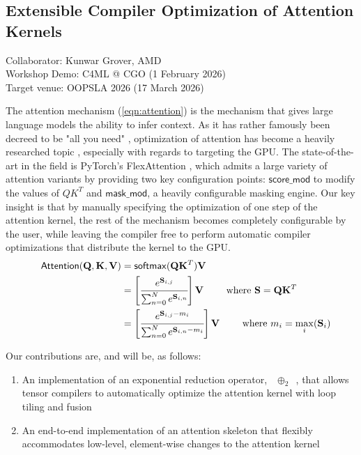 \documentclass[review, acmsmall, nonacm]{acmart}
\newcommand{\Attention}{\mathsf{Attention}}
\newcommand{\softmax}{\mathsf{softmax}}
\newcommand{\milakov}{~$\oplus_2$~}
\begin{document}
\subsection{Extensible Compiler Optimization of Attention Kernels}

\label{sec:attention}

Collaborator: Kunwar Grover, AMD \\
Workshop Demo: C4ML @ CGO (1 February 2026) \\
Target venue: OOPSLA 2026 (17 March 2026)

The attention mechanism (\autoref{eqn:attention}) is the mechanism that gives large language models the ability to infer context. As it has rather famously been decreed to be "all you need" \cite{vaswaniAttentionAllYou2023}, optimization of attention has become a heavily researched topic \cite{daoFlashAttentionFastMemoryEfficient2022,daoFlashAttention2FasterAttention2023,dongFlexAttentionProgramming2024}, especially with regards to targeting the GPU. The state-of-the-art in the field is PyTorch's FlexAttention \cite{dongFlexAttentionProgramming2024}, which admits a large variety of attention variants by providing two key configuration points: $\mathsf{score\_mod}$ to modify the values of $QK^T$ and $\mathsf{mask\_mod}$, a heavily configurable masking engine. Our key insight is that by manually specifying the optimization of one step of the attention kernel, the rest of the mechanism becomes completely configurable by the user, while leaving the compiler free to perform automatic compiler optimizations that distribute the kernel to the GPU.
\begin{align}
  \label{eqn:attention}
  \quad \Attention(\mathbf{Q}, \mathbf{K}, \mathbf{V}) 
  &= \softmax(\mathbf{Q} \mathbf{K}^T) \mathbf{V}
  \\
  \label{eqn:attention-math}
  &=\left[
    \cfrac {e^{\mathbf{S}_{i,j}}} 
           {\sum_{n=0}^{N} e^{\mathbf{S}_{i,n}}}
    \right]
    \mathbf{V}
    \qquad \text{ where } \mathbf{S} = \mathbf{Q} \mathbf{K}^T
  \\
  \label{eqn:attention-math-safe}
  &=\left[
      \cfrac {e^{\mathbf{S}_{i,j} - m_i}} 
             {\sum_{n=0}^{N} e^{\mathbf{S}_{i,n} - m_i}}
    \right]
    \mathbf{V}
    \qquad \text{ where } m_i = \max_{i}(\mathbf{S}_i)
\end{align}

Our contributions are, and will be, as follows:

\begin{enumerate}
  \item An implementation of an exponential reduction operator, \milakov, that allows tensor compilers to automatically optimize the attention kernel with loop tiling and fusion
  \item An end-to-end implementation of an attention skeleton that flexibly accommodates low-level, element-wise changes to the attention kernel
\end{enumerate}
\end{document}
